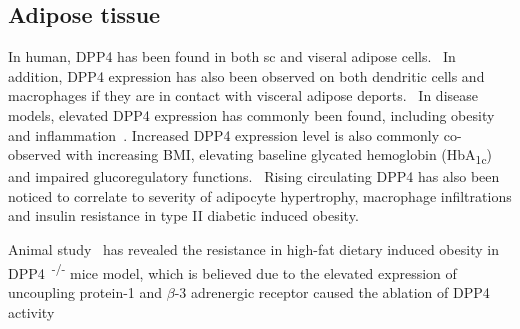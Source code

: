 \subsection{Adipose tissue}
In human, DPP4 has been found in both sc and viseral adipose cells.~\cite{Lamers2011} In addition, DPP4 expression has also been observed on both dendritic cells and macrophages if they are in contact with visceral adipose deports.~\cite{Zhong2013} In disease models, elevated DPP4 expression has commonly been found, including obesity and inflammation~\cite{Zhong2013}. Increased DPP4 expression level is also commonly co-observed with increasing BMI, elevating baseline glycated hemoglobin (HbA\textsubscript{1c})~\cite{2011} and impaired glucoregulatory functions.~\cite{Zhong2013,Sell2013} Rising circulating DPP4 has also been noticed to correlate to severity of adipocyte hypertrophy, macrophage infiltrations and insulin resistance in type II diabetic induced obesity.~\cite{Sell2013}  
\par 
Animal study~\cite{Conarello2003} has revealed the resistance in high-fat dietary induced obesity in DPP4~\textsuperscript{-/-} mice model, which is believed due to the elevated expression of uncoupling protein-1 and $\beta$-3 adrenergic receptor caused the ablation of DPP4 activity 